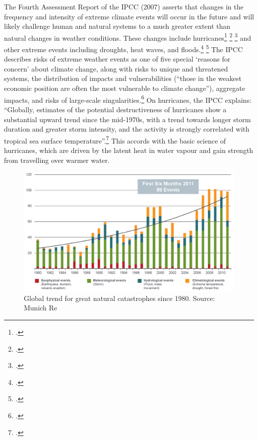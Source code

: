 \documentclass[10pt]{article}
\begin{document}
The Fourth Assessment Report of the IPCC (2007) asserts that changes in the frequency and intensity of extreme climate events will occur in the future and will likely challenge human and natural systems to a much greater extent than natural changes in weather conditions.
These changes include hurricanes\footcite[][]{Knutson2004} \footcite[See also: ][]{Villarini2013} \footcite[][]{NATropical} and other extreme events including droughts, heat waves, and floods.\footcite[Regarding heat waves, see: ][]{Bumbaco2013} \footcite[][]{HeatwavesQuadruple2013}
The IPCC describes risks of extreme weather events as one of five special `reasons for concern' about climate change, along with risks to unique and threatened systems, the distribution of impacts and vulnerabilities (``those in the weakest economic position are often the most vulnerable to climate change''), aggregate impacts, and risks of large-scale singularities.\footcite[][See: "The long-term perspective" \url{https://www.ipcc.ch/publications_and_data/ar4/syr/en/spms5.html}"]{IPCC2007}
On hurricanes, the IPCC explains: ``Globally, estimates of the potential destructiveness of hurricanes show a substantial upward trend since the mid-1970s, with a trend towards longer storm duration and greater storm intensity, and the activity is strongly correlated with tropical sea surface temperature''.\footcite[][]{IPCCHurricane}
This accords with the basic science of hurricanes, which are driven by the latent heat in water vapour and gain strength from travelling over warmer water.



\begin{figure}
\includegraphics[width=160mm]{s3-munich-cat.png}
\centering
\caption{Global trend for great natural catastrophes since 1980. Source: Munich Re}
\label{fig:s3-munich-cat}
\end{figure}
\end{document}
